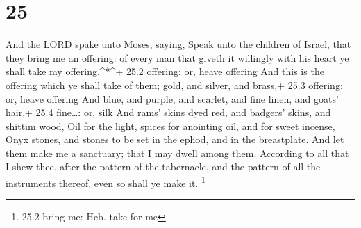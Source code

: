 \hypertarget{section-24}{%
\section{25}\label{section-24}}

 And the LORD spake unto Moses, saying,  Speak
unto the children of Israel, that they bring me an offering: of every
man that giveth it willingly with his heart ye shall take my
offering.\^{}*\^{}+ 25.2 offering: or, heave offering  And
this is the offering which ye shall take of them; gold, and silver, and
brass,+ 25.3 offering: or, heave offering  And blue, and
purple, and scarlet, and fine linen, and goats' hair,+ 25.4 fine\ldots:
or, silk  And rams' skins dyed red, and badgers' skins, and
shittim wood,  Oil for the light, spices for anointing oil,
and for sweet incense,  Onyx stones, and stones to be set in
the ephod, and in the breastplate.  And let them make me a
sanctuary; that I may dwell among them.  According to all
that I shew thee, after the pattern of the tabernacle, and the pattern
of all the instruments thereof, even so shall ye make it. \footnote{25.2
  bring me: Heb. take for me}

